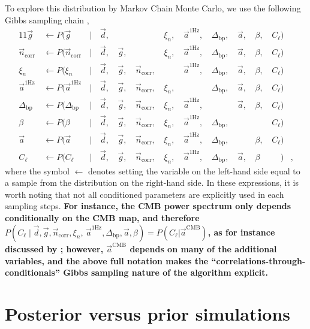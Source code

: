 \documentclass[twocolumn]{aa}%
\renewcommand{\d}[0]{\vec{d}}
\newcommand{\n}[0]{\vec{n}}
\renewcommand{\a}[0]{\vec{a}}
\newcommand{\g}[0]{\vec{g}}
\newcommand{\Dbp}[0]{\Delta_{\mathrm{bp}}}
\begin{document}
To explore this distribution by Markov Chain Monte Carlo, we use the following Gibbs sampling
chain \citep{bp01},
\begin{alignat}{11}
\g &\,\leftarrow P(\g&\,\mid &\,\d,&\, & &\,\xi_n, &\,\a^{\mathrm{1Hz}}, &\,\Dbp, &\,\a, &\,\beta, &\,C_{\ell})\label{eq:gibbs_g}\\
\n_{\mathrm{corr}} &\,\leftarrow P(\n_{\mathrm{corr}}&\,\mid &\,\d, &\,\g, &\,&\,\xi_n,
&\,\a^{\mathrm{1Hz}}, &\,\Dbp, &\,\a, &\,\beta, &\,C_{\ell})\\
\xi_n &\,\leftarrow P(\xi_n&\,\mid &\,\d, &\,\g, &\,\n_{\mathrm{corr}}, &\,
&\,\a^{\mathrm{1Hz}}, &\,\Dbp, &\,\a, &\,\beta, &\,C_{\ell})\\
\a^{\mathrm{1Hz}} &\,\leftarrow P(\a^{\mathrm{1Hz}}&\,\mid &\,\d,
&\,\g, &\,\n_{\mathrm{corr}}, &\,\xi_n, &\,
&\,\Dbp, &\,\a, &\,\beta, &\,C_{\ell})\\
\Dbp &\,\leftarrow P(\Dbp&\,\mid &\,\d, &\,\g, &\,\n_{\mathrm{corr}}, &\,\xi_n,
&\,\a^{\mathrm{1Hz}}, &\,&\,\a, &\,\beta, &\,C_{\ell})\\
\beta &\,\leftarrow P(\beta&\,\mid &\,\d, &\,\g, &\,\n_{\mathrm{corr}}, &\,\xi_n,
&\,\a^{\mathrm{1Hz}}, &\,\Dbp, & &\,&\,C_{\ell})\\
\a &\,\leftarrow P(\a&\,\mid &\,\d, &\,\g, &\,\n_{\mathrm{corr}}, &\,\xi_n,
&\,\a^{\mathrm{1Hz}}, &\,\Dbp, &\,&\,\beta, &\,C_{\ell})\\
C_{\ell} &\,\leftarrow P(C_{\ell}&\,\mid &\,\d, &\,\g, &\,\n_{\mathrm{corr}}, &\,\xi_n,
&\,\a^{\mathrm{1Hz}}, &\,\Dbp, &\,\a, &\,\beta&\,\phantom{C_{\ell}})&,\label{eq:gibbs_cl}
\end{alignat}
where the symbol $\leftarrow$ denotes setting the variable on the
left-hand side equal to a sample from the distribution on the
right-hand side. In these expressions, it is worth noting that not all
conditioned parameters are explicitly used in each sampling
steps. {\bf For instance, the CMB power spectrum only depends
  conditionally on the CMB map, and therefore $P(C_{\ell}\mid \d, \g,
  \n_{\mathrm{corr}}, \xi_n, \,\a^{\mathrm{1Hz}}, \Dbp, \a, \beta) =
  P(C_{\ell}|\a^{\mathrm{CMB}})$, as for instance discussed by
  \citet{wandelt2004,eriksen:2004}; however, $\a^{\mathrm{CMB}}$
  depends on many of the additional variables, and the above full
  notation makes the ``correlations-through-conditionals'' Gibbs
  sampling nature of the algorithm explicit.}

\section{Posterior versus prior simulations}
\label{sec:frequentist}
\end{document}
